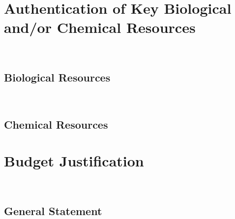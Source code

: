 \lipsum[66]

\newpage

\section*{Authentication of Key Biological and/or Chemical Resources}

~

\subsection*{Biological Resources}

\lipsum[2]

~

\subsection*{Chemical Resources}

\lipsum[2]

\newpage

\section*{Budget Justification}

~

\subsection*{General Statement}

\lipsum[66]

~

